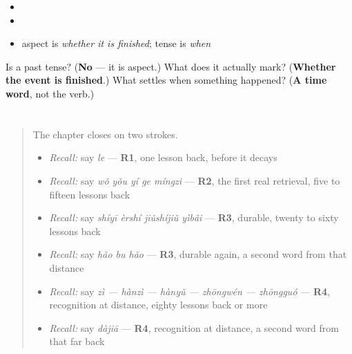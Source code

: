 \begin{itemize}
\raggedright
  \item {}
  \item {}
  \item aspect is \emph{whether it is finished}; tense is \emph{when}
\end{itemize}

\begin{tcolorbox}[breakable,colback=teal!4,colframe=teal!35!black,title={Before you move on}]
Is  a past tense? (\textbf{No} — it is aspect.) What does it actually mark? (\textbf{Whether the event is finished}.) What settles when something happened? (\textbf{A time word}, not the verb.)
\end{tcolorbox}
\section[Practice]{}

\label{lesson:ZH-C25-practice}



\begin{quote}
The chapter closes on two strokes.

\begin{itemize}
\raggedright
  \item \emph{Recall:} say \emph{le} — \textbf{R1}, one lesson back, before it decays
  \item \emph{Recall:} say \emph{wǒ yǒu yí ge míngzi} — \textbf{R2}, the first real retrieval, five to fifteen lessons back
  \item \emph{Recall:} say \emph{shíyī èrshí jiǔshíjiǔ yìbǎi} — \textbf{R3}, durable, twenty to sixty lessons back
  \item \emph{Recall:} say \emph{hǎo bu hǎo} — \textbf{R3}, durable again, a second word from that distance
  \item \emph{Recall:} say \emph{zì — hànzì — hànyǔ — zhōngwén — zhōngguó} — \textbf{R4}, recognition at distance, eighty lessons back or more
  \item \emph{Recall:} say \emph{dàjiā} — \textbf{R4}, recognition at distance, a second word from that far back
\end{itemize}
\end{quote}

